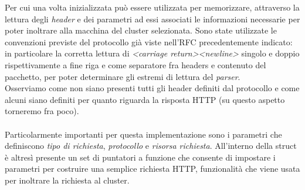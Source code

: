 \documentclass[italian]{tktltiki2}
\begin{document}
Per cui una volta inizializzata può essere utilizzata per memorizzare, attraverso la lettura degli \emph{header} e dei parametri ad essi associati le informazioni necessarie per poter inoltrare alla macchina del cluster selezionata. Sono state utilizzate le convenzioni previste del protocollo già viste nell'RFC precedentemente indicato: in particolare la corretta lettura di \emph{<carriage return><newline>} singolo e doppio rispettivamente a fine riga e come separatore fra headers e contenuto del pacchetto, per poter determinare gli estremi di lettura del \emph{parser}. \\ 
Osserviamo come non siano presenti tutti gli header definiti dal protocollo e come alcuni siano definiti per quanto riguarda la risposta HTTP (su questo aspetto torneremo fra poco). \\\\
Particolarmente importanti per questa implementazione sono i parametri che definiscono \emph{tipo di richiesta}, \emph{protocollo} e \emph{risorsa richiesta}. All'interno della struct è altresì presente un set di puntatori a funzione che consente di impostare i parametri per costruire una semplice richiesta HTTP, funzionalità che viene usata per inoltrare la richiesta al cluster.
\end{document}
